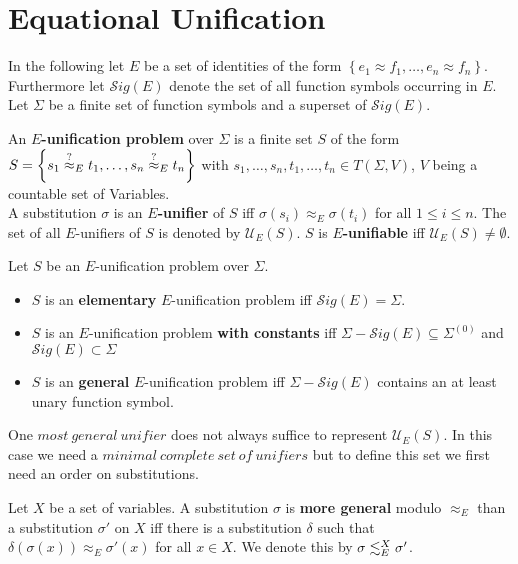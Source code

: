 \section{Equational Unification}
In the following let $E$ be a set of identities of the form $\left\lbrace  e_1\approx f_1,\dots,e_n\approx f_n \right\rbrace$. Furthermore let $\mathcal{S}ig(E)$ denote the set of all function symbols occurring in $E$. Let $\Sigma$ be a finite set of function symbols and a superset of $\mathcal{S}ig(E)$.
\begin{definition}
An \textbf{$E$-unification problem} over $\Sigma$ is a finite set $S$ of the form $S=\left\lbrace s_1\stackrel{?}{\approx}_{E} t_1,\dots,s_n\stackrel{?}{\approx}_{E} t_n\right\rbrace $ with $s_1,\dots,s_n,t_1,\dots,t_n \in T(\Sigma,V)$, $V$ being a countable set of Variables.\\
A substitution $\sigma$ is an \textbf{$E$-unifier} of $S$ iff $ \sigma(s_i)\approx_E \sigma(t_i)$ for all $1\leq i \leq n$.
The set of all $E$-unifiers of $S$ is denoted by $\mathcal{U}_E(S)$. $S$ is \textbf{$E$-unifiable} iff $\mathcal{U}_E(S)\neq \emptyset$.
\end{definition}
\begin{definition}
Let $S$ be an $E$-unification problem over $\Sigma$.
\begin{itemize}
\item $S$ is an \textbf{elementary} $E$-unification problem iff $\mathcal{S}ig(E)=\Sigma$.
\item $S$ is an $E$-unification problem \textbf{with constants} iff $\Sigma-\mathcal{S}ig(E)\subseteq\Sigma^{(0)}$ and $\mathcal{S}ig(E)\subset\Sigma$
\item $S$ is an \textbf{general} $E$-unification problem iff $\Sigma-\mathcal{S}ig(E)$ contains an at least unary function symbol.
\end{itemize}
\end{definition}
One $most\ general\ unifier$ does not always suffice to represent $\mathcal{U}_E(S)$. In this case we need a $minimal\ complete\ set\ of\ unifiers$ but to define this set we first need an order on substitutions.
\begin{definition}
Let $X$ be a set of variables. A substitution $\sigma$ is \textbf{more general} modulo $\approx_E$ than a substitution $\sigma'$ on $X$ iff there is a substitution $\delta$ such that $\delta(\sigma(x))\approx_E\sigma'(x)$ for all $x \in X$. We denote this by $\sigma\lesssim^X_E\sigma'$.
\end{definition}
